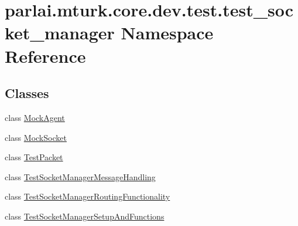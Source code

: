 \hypertarget{namespaceparlai_1_1mturk_1_1core_1_1dev_1_1test_1_1test__socket__manager}{}\section{parlai.\+mturk.\+core.\+dev.\+test.\+test\+\_\+socket\+\_\+manager Namespace Reference}
\label{namespaceparlai_1_1mturk_1_1core_1_1dev_1_1test_1_1test__socket__manager}
\subsection*{Classes}
\begin{DoxyCompactItemize}
\item 
class \hyperlink{classparlai_1_1mturk_1_1core_1_1dev_1_1test_1_1test__socket__manager_1_1MockAgent}{Mock\+Agent}
\item 
class \hyperlink{classparlai_1_1mturk_1_1core_1_1dev_1_1test_1_1test__socket__manager_1_1MockSocket}{Mock\+Socket}
\item 
class \hyperlink{classparlai_1_1mturk_1_1core_1_1dev_1_1test_1_1test__socket__manager_1_1TestPacket}{Test\+Packet}
\item 
class \hyperlink{classparlai_1_1mturk_1_1core_1_1dev_1_1test_1_1test__socket__manager_1_1TestSocketManagerMessageHandling}{Test\+Socket\+Manager\+Message\+Handling}
\item 
class \hyperlink{classparlai_1_1mturk_1_1core_1_1dev_1_1test_1_1test__socket__manager_1_1TestSocketManagerRoutingFunctionality}{Test\+Socket\+Manager\+Routing\+Functionality}
\item 
class \hyperlink{classparlai_1_1mturk_1_1core_1_1dev_1_1test_1_1test__socket__manager_1_1TestSocketManagerSetupAndFunctions}{Test\+Socket\+Manager\+Setup\+And\+Functions}
\end{DoxyCompactItemize}
